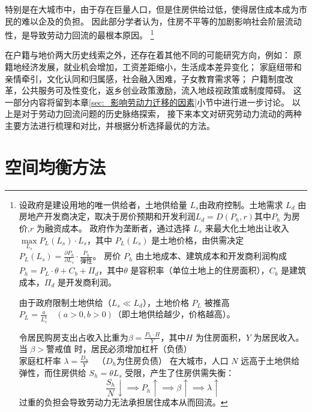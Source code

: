 \documentclass[a4paper, zihao=-4, fontset = mac, oneside]{ctexbook} %
\let\oldfootnote\footnote
\renewcommand{\footnote}[1]{%
  \oldfootnote{\setstretch{1.5}#1}%
}
\begin{document}
特别是在大城市中，由于存在巨量人口，但是住房供给过低，使得居住成本成为市民的难以企及的负担。
因此部分学者认为，住房不平等的加剧影响社会阶层流动性，是导致劳动力回流的最根本原因。
\footnote{
  设政府是建设用地的唯一供给者，土地供给量 \( L_s \)由政府控制。土地需求 \( L_d \) 由房地产开发商决定，取决于房价预期和开发利润\(L_d = D(P_h, r)\)其中\( P_h \) 为房价,\( r \) 为融资成本。
  政府作为垄断者，通过选择 \( L_s \) 来最大化土地出让收入\(\max\limits_{L_s}  P_L(L_s) \cdot L_s \)，其中 \( P_L(L_s) \) 是土地价格，由供需决定\( P_L(L_s) = \frac{\partial P_h}{\partial L_s} \cdot \frac{P_h}{\text{弹性}} \)。
  房价 \( P_h \) 由土地成本、建筑成本和开发商利润构成$P_h = P_L \cdot \theta + C_b + \Pi_d$，其中\( \theta \) 是容积率（单位土地上的住房面积），\( C_b \) 是建筑成本，\( \Pi_d \) 是开发商利润。

  由于政府限制土地供给（\( L_s \ll L_d \)），土地价格 \( P_L \) 被推高$P_L = \frac{a}{L_s^b} \quad (a>0, b>0)$（即土地供给越少，价格越高）。

  令居民购房支出占收入比重为$\beta = \frac{P_h \cdot H}{Y}$，其中\( H \) 为住房面积，\( Y \) 为居民收入。
  当 \( \beta > \text{警戒值}\) 时，居民必须增加杠杆（负债）
  $\text{家庭杠杆率 } \lambda = \frac{D_h}{Y} \quad \text{（} D_h \text{为住房负债）}$
  在大城市，人口 \( N \) 远高于土地供给弹性，而住房供给 \( S_h = \theta L_s \) 受限，产生了住房供需失衡：
  \[
  \frac{S_h}{N} \downarrow \implies P_h \uparrow \implies \beta \uparrow \implies \lambda \uparrow
  \]
  过重的负担会导致劳动力无法承担居住成本从而回流。
}

在户籍与地价两大历史线索之外，还存在着其他不同的可能研究方向，例如：
原籍地经济发展，就业机会增加，工资差距缩小，生活成本差异变化；
家庭纽带和亲情牵引，文化认同和归属感，社会融入困难，子女教育需求等；
户籍制度改革，公共服务可及性变化，返乡创业政策激励，流入地歧视政策或制度障碍。
这一部分内容将留到本章\ref{sec:_影响劳动力迁移的因素}小节中进行进一步讨论。
以上是对于劳动力回流问题的历史脉络探索，
接下来本文对研究劳动力流动的两种主要方法进行梳理和对比，并根据分析选择最优的方法。

\section{空间均衡方法}
\end{document}
